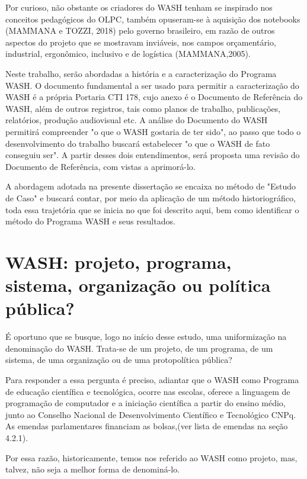 Por curioso, não obstante os criadores do WASH tenham se inspirado nos conceitos pedagógicos do OLPC, também opuseram-se à aquisição dos notebooks (MAMMANA e TOZZI, 2018) pelo governo brasileiro, em razão de outros aspectos do projeto que se mostravam inviáveis, nos campos orçamentário, industrial, ergonômico, inclusivo e de logística (MAMMANA,2005).

Neste trabalho, serão abordadas a história e a caracterização do Programa WASH. O documento fundamental a ser usado para permitir a caracterização do WASH é a própria Portaria CTI 178, cujo anexo é o Documento de Referência do WASH, além de outros registros, tais como planos de trabalho, publicações, relatórios,  produção audiovisual etc.  A análise do Documento do WASH permitirá compreender "o que o WASH gostaria de ter sido", ao passo que todo o desenvolvimento do trabalho buscará estabelecer "o que o WASH de fato conseguiu ser". A partir desses dois entendimentos, será proposta uma revisão do Documento de Referência, com vistas a aprimorá-lo.

A abordagem adotada na presente dissertação se encaixa no método de "Estudo de Caso"  e buscará contar, por meio da aplicação de um método historiográfico, toda essa trajetória que se inicia no que foi descrito aqui, bem como identificar o método do Programa WASH e seus resultados.

\section[WASH: projeto, programa, sistema, organização ou política pública?]{WASH: projeto, programa, sistema, organização ou política pública?}\label{WASH: projeto, programa, sistema, organização ou política pública?}
É oportuno que se busque, logo no início desse estudo, uma uniformização na denominação do WASH. Trata-se de um projeto, de um programa, de um sistema, de uma organização ou de uma protopolítica pública?

Para responder a essa pergunta é preciso, adiantar que o WASH como Programa de educação científica e tecnológica, ocorre nas escolas, oferece a linguagem de programação de computador e a iniciação científica a partir do  ensino médio, junto ao Conselho Nacional de Desenvolvimento Científico e Tecnológico CNPq. As emendas parlamentares financiam as bolsas,(ver  lista de emendas na seção 4.2.1).

Por essa razão, historicamente, temos nos referido ao WASH como projeto, mas, talvez, não seja a melhor forma de denominá-lo.

